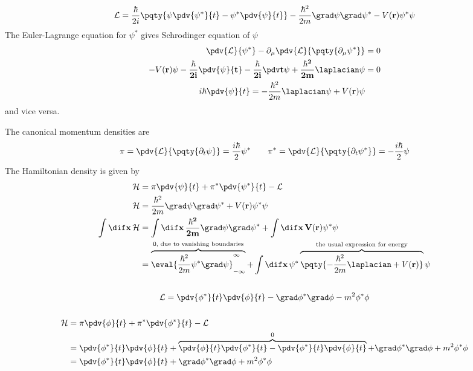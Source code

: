 \documentclass[12pt]{article}
\begin{document}
        \subsection{} { \begin{align*}
            \mathcal{L} = \frac{\hbar}{2i} \pqty{\psi \pdv{\psi^*}{t} - \psi^*\pdv{\psi}{t}} - \frac{\hbar^2}{2m} \grad \psi \grad \psi^* - V(\bf r)\psi^* \psi 
        \end{align*}}
        The Euler-Lagrange equation for \(\psi^*\) gives Schrodinger equation of \(\psi \)
        \begin{align*}
            \pdv{ \mathcal{L}}{\psi^* } -  \partial_\mu \pdv{ \mathcal{L}}{\pqty{\partial _\mu \psi^* }} &= 0\\
            - V(\bf r) \psi - \frac{\hbar}{2i}\pdv{\psi }{t}- \frac{\hbar}{2i}\pdv t \psi + \frac{\hbar^2}{2m} \laplacian \psi &=  0\\
            i \hbar \pdv{\psi }{t} = - \frac{\hbar^2}{2m}\laplacian \psi + V(\bf r)\psi 
        \end{align*}
        and vice versa.

        The canonical momentum densities are
        \[
            \pi = \pdv{ \mathcal{L}}{ \pqty{\partial_t \psi}} = \frac{i\hbar}{2} \psi^*\qquad\pi^* = \pdv{ \mathcal{L}}{ \pqty{\partial_t \psi^*}} = - \frac{i\hbar}{2}\psi
        \]
        The Hamiltonian density is given by 
        \begin{align*}
            \mathcal{H} &=  \pi\pdv{\psi}{t} + \pi^* \pdv{\psi^*}{t} - \mathcal{L}\\
            \mathcal{H} &=  \frac{\hbar^2}{2m} \grad \psi \grad \psi^* + V(\bf r)\psi^* \psi \\
            \int \dif \bf x\, \mathcal{H} &= \int \dif \bf x\,  \frac{\hbar^2}{2m} \grad \psi \grad\psi^* +\int \dif \bf x\, V(\bf r) \psi^*\psi \\
            &= \overbrace{\eval{ \frac{\hbar^2}{2m}\psi^* \grad \psi }_{ -\infty}^{\infty}}^{0 \text{, due to vanishing boundaries}} + \int \dif \bf x\, \psi^* \overbrace{\pqty{ - \frac{\hbar^2}{2m}\laplacian + V(\bf r)}}^\text{the usual expression for energy}\psi 
        \end{align*}
        \subsection{} { \[
            \mathcal{L} =\pdv{\phi^* }{t}\pdv{\phi }{t} - \grad \phi^*\grad \phi - m^2\phi^*\phi 
        \]}
            \subsubsection{} { \begin{align*}
                \mathcal{H} &=  \pi \pdv{\phi }{t} + \pi^*\pdv{\phi^* }{t} - \mathcal{L}\\
                &= \pdv{\phi^*}{t}\pdv{\phi }{t} + \overbrace{ \pdv{\phi }{t}\pdv{\phi^*}{t} -\pdv{\phi^* }{t}\pdv{\phi }{t}}^{0} + \grad \phi^*\grad \phi + m^2\phi^*\phi\\
                &= \pdv{\phi^*}{t}\pdv{\phi }{t} + \grad \phi^*\grad \phi + m^2\phi^*\phi
            \end{align*}}
\end{document}
